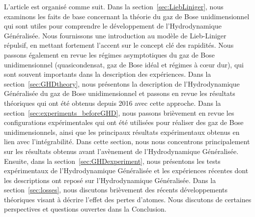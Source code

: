 L'article est organisé comme suit. Dans la section~\ref{sec:LiebLiniger}, nous examinons les faits de base concernant la théorie du gaz de Bose unidimensionnel qui sont utiles pour comprendre le développement de l'Hydrodynamique Généralisée. Nous fournissons une introduction au modèle de Lieb-Liniger répulsif, en mettant fortement l'accent sur le concept clé des rapidités. Nous passons également en revue les régimes asymptotiques du gaz de Bose unidimensionnel (quasicondensat, gaz de Bose idéal et régimes à cœur dur), qui sont souvent importants dans la description des expériences. Dans la section~\ref{sec:GHDtheory}, nous présentons la description de l'Hydrodynamique Généralisée du gaz de Bose unidimensionnel et passons en revue les résultats théoriques qui ont été obtenus depuis 2016 avec cette approche. Dans la section~\ref{sec:experiments_beforeGHD}, nous passons brièvement en revue les configurations expérimentales qui ont été utilisées pour réaliser des gaz de Bose unidimensionnels, ainsi que les principaux résultats expérimentaux obtenus en lien avec l'intégrabilité. Dans cette section, nous nous concentrons principalement sur les résultats obtenus avant l'avènement de l'Hydrodynamique Généralisée. Ensuite, dans la section~\ref{sec:GHDexperiment}, nous présentons les tests expérimentaux de l'Hydrodynamique Généralisée et les expériences récentes dont les descriptions ont reposé sur l'Hydrodynamique Généralisée. Dans la section~\ref{sec:losses}, nous discutons brièvement des récents développements théoriques visant à décrire l'effet des pertes d'atomes. Nous discutons de certaines perspectives et questions ouvertes dans la Conclusion.


 
 
 
 